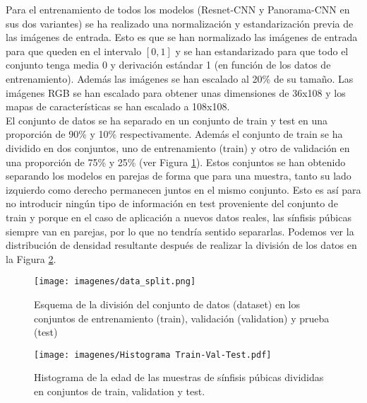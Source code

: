 
Para el entrenamiento de todos los modelos (Resnet-CNN y Panorama-CNN en sus dos variantes) se ha realizado una normalización y estandarización previa de las imágenes de entrada. Esto es que se han normalizado las imágenes de entrada para que queden en el intervalo $[0,1]$ y se han estandarizado para que todo el conjunto tenga media 0 y derivación estándar 1 (en función de los datos de entrenamiento). Además las imágenes se han escalado al 20\% de su tamaño. Las imágenes RGB se han escalado para obtener unas dimensiones de 36x108 y los mapas de características se han escalado a 108x108.\\

El conjunto de datos se ha separado en un conjunto de train y test en una proporción de 90\% y 10\% respectivamente. Además el conjunto de train se ha dividido en dos conjuntos, uno de entrenamiento (train) y otro de validación en una proporción de 75\% y 25\% (ver Figura \ref{fig:data_split}). Estos conjuntos se han obtenido separando los modelos en parejas de forma que para una muestra, tanto su lado izquierdo como derecho permanecen juntos en el mismo conjunto. Esto es así para no introducir ningún tipo de información en test proveniente del conjunto de train y porque en el caso de aplicación a nuevos datos reales, las sínfisis púbicas siempre van en parejas, por lo que no tendría sentido separarlas. Podemos ver la distribución de densidad resultante después de realizar la división de los datos en la Figura \ref{fig:histograma_sets}.\\

\begin{figure}[ht]
    \centering
    \texttt{[image: imagenes/data\_split.png]}
    \caption[Esquema de la división del conjunto de datos.]{Esquema de la división del conjunto de datos (dataset) en los conjuntos de entrenamiento (train), validación (validation) y prueba (test)}
    \label{fig:data_split}
\end{figure}

\begin{figure}[ht]
    \centering
    \texttt{[image: imagenes/Histograma Train-Val-Test.pdf]}
    \caption{Histograma de la edad de las muestras de sínfisis púbicas divididas en conjuntos de train, validation y test.}
    \label{fig:histograma_sets}
\end{figure}

